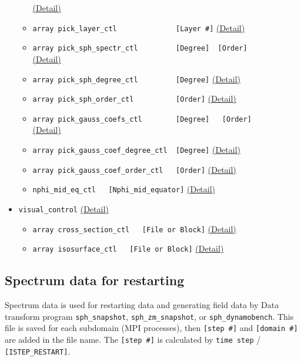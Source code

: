 \begin{itemize}
\begin{itemize}
    		\hyperref[href_t:nusselt_number_prefix]{(Detail)}
	\item \verb|array pick_layer_ctl              [Layer #]|
    		\hyperref[href_t:pick_layer_ctl]{(Detail)}
	\item \verb|array pick_sph_spectr_ctl         [Degree]  [Order]| \\
    		\hyperref[href_t:pick_sph_spectr_ctl]{(Detail)}
	\item \verb|array pick_sph_degree_ctl         [Degree]|
    		\hyperref[href_t:pick_sph_degree_ctl]{(Detail)}
	\item \verb|array pick_sph_order_ctl          [Order]|
    		\hyperref[href_t:pick_sph_order_ctl]{(Detail)}
	\item \verb|array pick_gauss_coefs_ctl        [Degree]   [Order]| \\
    		\hyperref[href_t:pick_gauss_coefs_ctl]{(Detail)}
	\item \verb|array pick_gauss_coef_degree_ctl  [Degree]|
    		\hyperref[href_t:pick_gauss_coef_degree_ctl]{(Detail)}
	\item \verb|array pick_gauss_coef_order_ctl   [Order]|
    		\hyperref[href_t:pick_gauss_coef_order_ctl]{(Detail)}
%
	\item \verb|nphi_mid_eq_ctl   [Nphi_mid_equator]|
		\label{href_i:nphi_mid_eq_ctl}
    		\hyperref[href_t:nphi_mid_eq_ctl]{(Detail)}
%
	\end{itemize}
%
\item \verb|visual_control|
    \label{href_i:visual_control}
    \hyperref[href_t:visual_control]{(Detail)}
    \begin{itemize}
    \item \verb|array cross_section_ctl   [File or Block]|
            \hyperref[href_t:cross_section_ctl]{(Detail)}
    \item \verb|array isosurface_ctl   [File or Block]|
            \hyperref[href_t:isosurface_ctl]{(Detail)}
%
    \end{itemize}
\end{itemize}
%
\subsection{Spectrum data for restarting}
Spectrum data is used for restarting data and generating field data by Data transform program \verb|sph_snapshot|, \verb|sph_zm_snapshot|, or \verb|sph_dynamobench|. This file is saved for each subdomain (MPI processes), then \verb|[step #]| and \verb|[domain #]| are added in the file name. The \verb|[step #]| is calculated by \verb|time step| / \verb|[ISTEP_RESTART]|.

